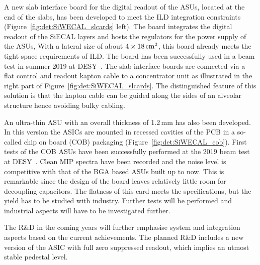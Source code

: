  A new slab interface board for the digital readout of the ASUs, located at the end of the slabs, has been developed to meet the ILD integration constraints (Figure~\ref{fig:det:SiWECAL_slcards} left). The board integrates the digital readout of the SiECAL layers and hosts the regulators for the power supply of the ASUs,
 With a lateral size of about $4\times 18\,{\rm cm^2}$, this board already meets the tight space requirements of ILD. The board has been successfully used in a beam test in summer 2019 at DESY~\cite{bib:talk-twepp-jj}.
 The slab interface boards are connected via a flat control and readout kapton cable to a concentrator unit as illustrated in the right part of Figure~\ref{fig:det:SiWECAL_slcards}. 
 The distinguished feature of this solution is that the kapton cable can be guided along the sides of an alveolar structure hence avoiding bulky cabling. 
 
An ultra-thin ASU with an overall thickness of 1.2\,mm has also been developed. In this version the ASICs are mounted in recessed cavities of the PCB in a so-called chip on board (COB) packaging (Figure~\ref{fig:det:SiWECAL_cob}). 
 First tests of the COB ASUs have been successfully performed at the 2019 beam test at DESY~\cite{bib:talk-twepp-jj}. Clean MIP spectra have been recorded and the noise level is competitive with that of the BGA based ASUs built up to now. This is remarkable since the design of the board leaves relatively little room for decoupling capacitors. The flatness of this card  meets the specifications, but the yield has to be studied with industry. Further tests will be performed and industrial aspects will  have to be investigated further.



The R\&D in the coming years will further emphasise system and integration aspects based on the current achievements. The planned R\&D includes a new version of the  ASIC with full zero suppressed readout, which implies an utmost stable pedestal level.


